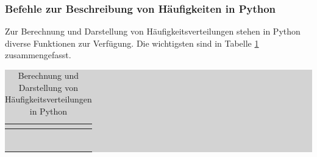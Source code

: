 \subsubsection{Befehle zur Beschreibung von H\"{a}ufigkeiten in Python}

\noindent Zur Berechnung und Darstellung von H\"{a}ufigkeitsverteilungen stehen in Python diverse Funktionen zur Verf\"{u}gung. Die wichtigsten sind in Tabelle \ref{tab:threesix} zusammengefasst.

\begin{table}[H]
\setlength{\arrayrulewidth}{.1em}
\caption{Berechnung und Darstellung von H\"{a}ufigkeitsverteilungen in Python}
\setlength{\fboxsep}{0pt}%
\colorbox{lightgray}{%
%
\begin{tabular}{| c | c |}
\hline
\parbox[c][0.3in][c]{3.3in}{\smallskip\centering\textbf{\selectfont{Python Befehl}}} & 
\parbox[c][0.3in][c]{3.3in}{\smallskip\centering\textbf{\selectfont{Funktionsbeschreibung}}}\\ \hline

\parbox[c][0.3in][c]{3.3in}{\centering{}\selectfont{sorted}} & 
\parbox[c][0.3in][c]{3.3in}{\centering{}}\\ \hline

\parbox[c][0.3in][c]{3.3in}{\centering{}\selectfont{numpy.cumsum}} & 
\parbox[c][0.3in][c]{3.3in}{\centering{}\selectfont{Berechnet die kumulative Summe des Vektors x}}\\ \hline

\parbox[c][0.5in][c]{3.3in}{\centering{}\selectfont{numpy.histogram}} & 
\parbox[c][0.5in][c]{3.3in}{\centering{}}\\ \hline

\parbox[c][0.3in][c]{3.3in}{\centering{}\selectfont{count}} & 
\parbox[c][0.3in][c]{3.3in}{\centering{}}\\ \hline

\parbox[c][0.5in][c]{3.3in}{\centering{}\selectfont{matplotlib.pyplot.bar}} & 
\parbox[c][0.5in][c]{3.3in}{\centering{}\selectfont{Erzeugt ein Balkendiagramm ausx mit vertikaler Ausrichtung}}\\ \hline

\parbox[c][0.5in][c]{3.3in}{\centering{}\selectfont{matplotlib.pyplot.barh}} & 
\parbox[c][0.5in][c]{3.3in}{\centering{}\selectfont{Erzeugt ein Balkendiagramm ausX mit horizontaler Ausrichtung}}\\ \hline

\parbox[c][0.3in][c]{3.3in}{\centering{}\selectfont{matplotlib.pyplot.pie}} & 
\parbox[c][0.3in][c]{3.3in}{\centering{}\selectfont{Erzeugt ein Kreisdiagramm aus x}}\\ \hline

\end{tabular}%
}
\label{tab:threesix}
\end{table}

